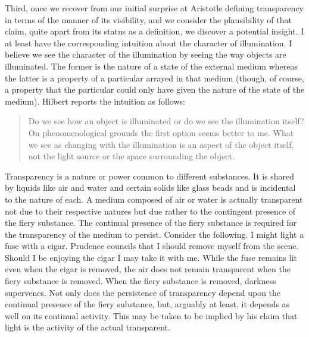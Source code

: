 \documentclass[12pt]{article}
\begin{document}
Third, once we recover from our initial surprise at Aristotle defining transparency in terms of the manner of its visibility, and we consider the plausibility of that claim, quite apart from its status as a definition, we discover a potential insight. I at least have the corresponding intuition about the character of illumination. I believe we see the character of the illumination by seeing the way objects are illuminated. The former is the nature of a state of the external medium whereas the latter is a property of a particular arrayed in that medium (though, of course, a property that the particular could only have given the nature of the state of the medium). Hilbert reports the intuition as follows:
\begin{quote}
	Do we see how an object is illuminated or do we see the illumination itself? On phenomenological grounds the first option seems better to me. What we see as changing with the illumination is an aspect of the object itself, not the light source or the space surrounding the object. \citep[150--151]{Hilbert:2007qy}
\end{quote}

Transparency is a nature or power common to different substances. It is shared by liquids like air and water and certain solids like glass beads and is incidental to the nature of each. A medium composed of air or water is actually transparent not due to their respective natures but due rather to the contingent presence of the fiery substance. The continual presence of the fiery substance is required for the transparency of the medium to persist. Consider the following. I might light a fuse with a cigar. Prudence councils that I should remove myself from the scene. Should I be enjoying the cigar I may take it with me. While the fuse remains lit even when the cigar is removed, the air does not remain transparent when the fiery substance is removed. When the fiery substance is removed, darkness supervenes. Not only does the persistence of transparency depend upon the continual presence of the fiery substance, but, arguably at least, it depends as well on its continual activity. This may be taken to be implied by his claim that light is the activity of the actual transparent.
\end{document}
